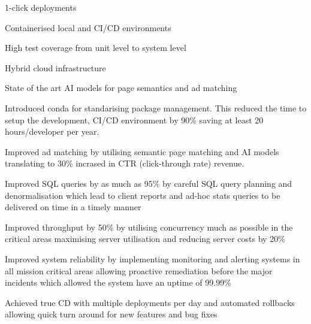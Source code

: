 \documentclass[11pt,A4]{article}
\newcommand{\cvlist}[1] {
    \begin{itemize}[itemsep=3pt,topsep=10pt]{#1}\end{itemize}
}
\begin{document}
\begin{paracol}{2}
\begin{rightcolumn}
{{                \item 1-click deployments
                \item Containerised local and CI/CD environments
                \item High test coverage from unit level to system level
                \item Hybrid cloud infrastructure
                \item State of the art AI models for page semantics and ad matching
            }}
            {\cvlist{
                \item Introduced conda for standarising package management. This reduced the time to setup the development, CI/CD environment by 90\% saving at least 20 hours/developer per year.
                \item Improved ad matching by utilising semantic page matching and AI models translating to 30\% incrased in CTR (click-through rate) revenue.
                \item Improved SQL queries by as much as 95\% by careful SQL query planning and denormalisation which lead to client reports and ad-hoc stats queries to be delivered on time in a timely manner
                \item Improved throughput by 50\% by utilising concurrency much as possible in the critical areas maximising server utilisation and reducing server costs by 20\%
                \item Improved system reliability by implementing monitoring and alerting systems in all mission critical areas allowing proactive remediation before the major incidents which allowed the system have an uptime of 99.99\%
                \item Achieved true CD with multiple deployments per day and automated rollbacks allowing quick turn around for new features and bug fixes
            }}


\end{rightcolumn}
\end{paracol}
\end{document}
